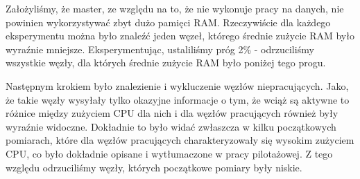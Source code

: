 Założyliśmy, że master, ze względu na to, że nie wykonuje pracy na danych, nie powinien wykorzystywać zbyt dużo pamięci RAM. Rzeczywiście dla każdego eksperymentu można było znaleźć jeden węzeł, którego średnie zużycie RAM było wyraźnie mniejsze. Eksperymentując, ustaliliśmy próg 2\% - odrzuciliśmy wszystkie węzły, dla których średnie zużycie RAM było poniżej tego progu.

Następnym krokiem było znalezienie i wykluczenie węzłów niepracujących. Jako, że takie węzły wysyłały tylko okazyjne informacje o tym, że wciąż są aktywne to różnice między zużyciem CPU dla nich i dla węzłów pracujących również były wyraźnie widoczne. Dokładnie to było widać zwłaszcza w kilku początkowych pomiarach, które dla węzłów pracujących charakteryzowały się wysokim zużyciem CPU, co było dokładnie opisane i wytłumaczone w pracy pilotażowej. Z tego względu odrzuciliśmy węzły, których początkowe pomiary były niskie.

